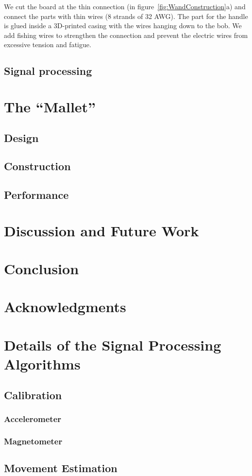\documentclass{nime-alternate} %
\begin{document}
We cut the board at the thin connection (in figure~\ref{fig:WandConstruction}a) and connect the parts with thin wires (8 strands of 32 AWG). The part for the handle is glued inside a 3D-printed casing with the wires hanging down to the bob. We add fishing wires to strengthen the connection and prevent the electric wires from excessive tension and fatigue.

\subsection{Signal processing}

\section{The ``Mallet''}

\subsection{Design}

\subsection{Construction}

\subsection{Performance}

\section{Discussion and Future Work}

\section{Conclusion}

\section{Acknowledgments}


 

\appendix
\section{Details of the Signal Processing Algorithms}
\subsection{Calibration}
\subsubsection{Accelerometer}
\subsubsection{Magnetometer}
\subsection{Movement Estimation}
\end{document}
